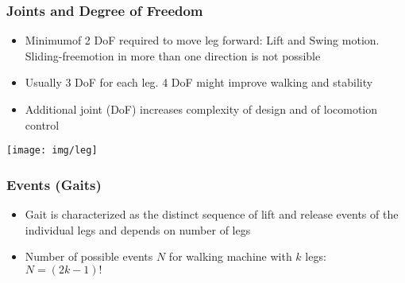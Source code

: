\documentclass[fontsize=6pt]{scrartcl}
\begin{document}
\begin{multicols*}{4}
\subsubsection*{Joints and Degree of Freedom}

\begin{minipage}{0.69\linewidth}
	\begin{itemize}
		\item Minimumof 2 DoF required to move leg forward: Lift and Swing motion.
			  Sliding-freemotion in more than one direction is not possible
		\item Usually 3 DoF for each leg. 4 DoF might improve walking and stability
		\item Additional joint (DoF) increases complexity of design and of locomotion control
	\end{itemize}
\end{minipage}
\begin{minipage}{0.3\linewidth}
	\texttt{[image: img/leg]}
\end{minipage}

\subsubsection*{Events (Gaits)}
\begin{itemize}
	\item Gait is characterized as the distinct sequence of lift and release events
		  of the individual legs and depends on number of legs
	\item Number of possible events $N$ for walking machine with $k$ legs:\\ $N = (2k - 1)!$
\end{itemize}


\end{multicols*}
\end{document}

